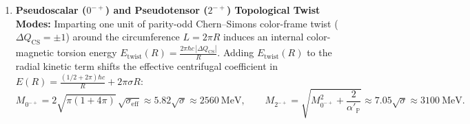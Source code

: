 \documentclass[11pt, a4paper]{article}
\theoremstyle{definition}
\theoremstyle{remark}
\begin{document}
\begin{enumerate}
  \item \textbf{Pseudoscalar ($0^{-+}$) and Pseudotensor ($2^{-+}$) Topological Twist Modes:} Imparting one unit of parity-odd Chern--Simons color-frame twist ($\Delta Q_{\mathrm{CS}} = \pm 1$) around the circumference $L = 2\pi R$ induces an internal color-magnetic torsion energy $E_{\mathrm{twist}}(R) = \frac{2\pi\hbar c\,|\Delta Q_{\mathrm{CS}}|}{R}$. Adding $E_{\mathrm{twist}}(R)$ to the radial kinetic term shifts the effective centrifugal coefficient in $E(R) = \frac{(1/2 + 2\pi)\hbar c}{R} + 2\pi\sigma R$:
  \begin{equation}
    M_{0^{-+}} = 2\sqrt{\pi\left(1 + 4\pi\right)}\,\sqrt{\sigma_{\mathrm{eff}}} \approx 5.82\sqrt{\sigma} \approx 2560~\mathrm{MeV}, \qquad
    M_{2^{-+}} = \sqrt{M_{0^{-+}}^{2} + \frac{2}{\alpha'_{\mathbb{P}}}} \approx 7.05\sqrt{\sigma} \approx 3100~\mathrm{MeV}.
  \end{equation}
\end{enumerate}

\begin{table}[h!]
\centering
\caption{Non-perturbative $SU(3)$ Yang--Mills glueball mass spectrum derived from closed flux-tube phase dynamics on $\mathcal{C}_{a}$ ($\sqrt{\sigma} = 440~\mathrm{MeV}$) compared with continuum-extrapolated anisotropic Lattice QCD benchmarks (Morningstar \& Peardon 1999; Chen et al. 2006).}
\vspace{0.5em}
\label{tab:glueball_spectrum}
\end{table}
\end{document}
